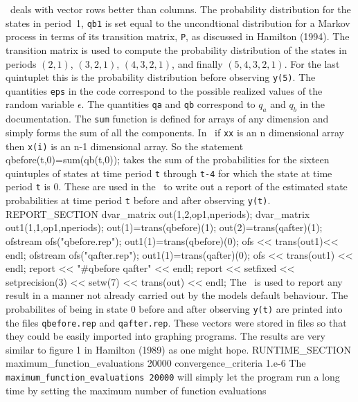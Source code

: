 \documentclass[12pt]{book}
\begin{document}
\ADM\ deals with vector rows better than columns.
The probability distribution for the states in period~1, {\tt qb1}
is set equal to the uncondtional distribution for a Markov process
in terms of its transition matrix, {\tt P}, as discussed in Hamilton (1994).
The transition matrix is used to compute the probability distribution of the
states in  periods $(2,1)$, $(3,2,1)$, $(4,3,2,1)$, and finally
$(5,4,3,2,1)$. For the last quintuplet this is the probability  
distribution before observing {\tt y(5)}. The quantities {\tt eps}
in the code correspond to the possible 
realized values of the random variable $\epsilon$. The quantities
{\tt qa} and  {\tt qb} correspond to $q_a$ and $q_b$ in the documentation.
The {\tt sum} function is defined for arrays of any dimension and simply
forms the sum of all the components. In \ADM\ if {\tt xx} is an n dimensional
array then {\tt x(i)} is an n-1 dimensional array. So the statement
\beginexample
    qbefore(t,0)=sum(qb(t,0));
\endexample
\noindent takes the sum of the probabilities for the 
sixteen quintuples of states at time period {\tt t} through {\tt t-4}
for which the state at time period {\tt t} is $0$. These are used in the
\RS\ to write out a report of the estimated state probabilities at time
period {\tt t} before and after observing {\tt y(t)}.
\beginexample
REPORT_SECTION
  dvar_matrix out(1,2,op1,nperiods);
  dvar_matrix out1(1,1,op1,nperiods);
  out(1)=trans(qbefore)(1);
  out(2)=trans(qafter)(1);
  {
    ofstream ofs("qbefore.rep");
    out1(1)=trans(qbefore)(0);
    ofs << trans(out1)<< endl;
  }  
  {
    ofstream ofs("qafter.rep");
    out1(1)=trans(qafter)(0);
    ofs << trans(out1) << endl;
  }  
  report << "#qbefore    qafter" <<  endl;
  report << setfixed << setprecision(3) << setw(7) << trans(out) << endl;
\endexample
{}
The \RS\ is used to report any result in a manner not already
carried out by the models default behaviour. The probabilites of
being in state $0$ before and after observing {\tt y(t)}
are printed into the files {\tt qbefore.rep} and {\tt qafter.rep}.
These vectors were stored in files so that they could be easily imported into 
graphing programs. The results are very similar to figure 1 in Hamilton
(1989) as one might hope.
\beginexample
RUNTIME_SECTION
  maximum_function_evaluations 20000 
  convergence_criteria 1.e-6 
\endexample
{} 
The  {\tt maximum\_function\_evaluations 20000} will simply let the program
run a long time by setting the maximum number of function evaluations
\end{document}
